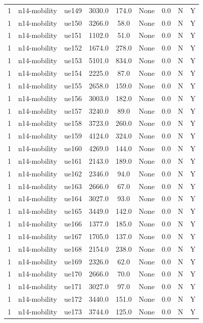 \begin{table}[ht]
\begin{tabular}{|c|c|c|c|c|c|c|c|c|}
1 & n14-mobility & ue149 & 3030.0 & 174.0 & None & 0.0 & N & Y \\
1 & n14-mobility & ue150 & 3266.0 & 58.0 & None & 0.0 & N & Y \\
1 & n14-mobility & ue151 & 1102.0 & 51.0 & None & 0.0 & N & Y \\
1 & n14-mobility & ue152 & 1674.0 & 278.0 & None & 0.0 & N & Y \\
1 & n14-mobility & ue153 & 5101.0 & 834.0 & None & 0.0 & N & Y \\
1 & n14-mobility & ue154 & 2225.0 & 87.0 & None & 0.0 & N & Y \\
1 & n14-mobility & ue155 & 2658.0 & 159.0 & None & 0.0 & N & Y \\
1 & n14-mobility & ue156 & 3003.0 & 182.0 & None & 0.0 & N & Y \\
1 & n14-mobility & ue157 & 3240.0 & 89.0 & None & 0.0 & N & Y \\
1 & n14-mobility & ue158 & 3723.0 & 260.0 & None & 0.0 & N & Y \\
1 & n14-mobility & ue159 & 4124.0 & 324.0 & None & 0.0 & N & Y \\
1 & n14-mobility & ue160 & 4269.0 & 144.0 & None & 0.0 & N & Y \\
1 & n14-mobility & ue161 & 2143.0 & 189.0 & None & 0.0 & N & Y \\
1 & n14-mobility & ue162 & 2346.0 & 94.0 & None & 0.0 & N & Y \\
1 & n14-mobility & ue163 & 2666.0 & 67.0 & None & 0.0 & N & Y \\
1 & n14-mobility & ue164 & 3027.0 & 93.0 & None & 0.0 & N & Y \\
1 & n14-mobility & ue165 & 3449.0 & 142.0 & None & 0.0 & N & Y \\
1 & n14-mobility & ue166 & 1377.0 & 185.0 & None & 0.0 & N & Y \\
1 & n14-mobility & ue167 & 1705.0 & 137.0 & None & 0.0 & N & Y \\
1 & n14-mobility & ue168 & 2154.0 & 238.0 & None & 0.0 & N & Y \\
1 & n14-mobility & ue169 & 2326.0 & 62.0 & None & 0.0 & N & Y \\
1 & n14-mobility & ue170 & 2666.0 & 70.0 & None & 0.0 & N & Y \\
1 & n14-mobility & ue171 & 3027.0 & 97.0 & None & 0.0 & N & Y \\
1 & n14-mobility & ue172 & 3440.0 & 151.0 & None & 0.0 & N & Y \\
1 & n14-mobility & ue173 & 3744.0 & 125.0 & None & 0.0 & N & Y \\

\end{tabular}
\end{table}
